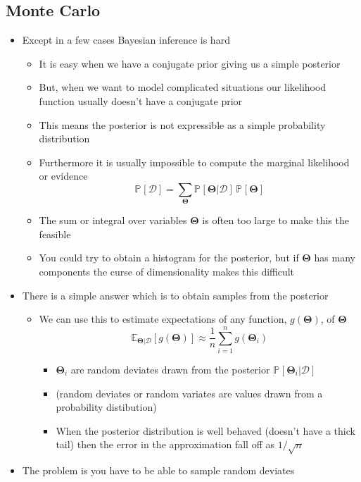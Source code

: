 \documentclass[11pt]{article}
\newcommand{\av}[2][]{\mathbb{E}_{#1\!}\left[ #2 \right]}
\newcommand{\Prob}[2][]{\mathbb{P}_{#1\!}\left[ #2 \right]}
\begin{document}
\subsection{Monte Carlo}
\label{sec:orgd15bcda}
\begin{itemize}
\item Except in a few cases Bayesian inference is hard
\begin{itemize}
\item It is easy when we have a conjugate prior giving us a simple posterior
\item But, when we want to model complicated situations our
likelihood function usually doesn't have a conjugate prior
\item This means the posterior is not expressible as a simple
probability distribution
\item Furthermore it is usually impossible to compute the marginal
likelihood or evidence
$$ \Prob{\mathcal{D}} = \sum_{\bm{\Theta}}
       \Prob{\bm{\Theta}|\mathcal{D}} \, \Prob{\bm{\Theta}} $$
\item The sum or integral over variables \(\bm{\Theta}\) is often too
large to make this the feasible
\item You could try to obtain a histogram for the posterior, but if
\(\bm{\Theta}\) has many components the curse of dimensionality
makes this difficult
\end{itemize}
\item There is a simple answer which is to obtain samples from the posterior
\begin{itemize}
\item We can use this to estimate expectations of any function,
\(g(\bm{\Theta})\), of \(\bm{\Theta}\)
$$ \av[\bm{\Theta}|\mathcal{D}]{g(\bm{\Theta})} \approx
       \frac{1}{n} \sum_{i=1}^{n}   g(\bm{\Theta}_{i}) $$
\begin{itemize}
\item \(\bm{\Theta}_{i}\) are random deviates drawn from
the posterior \(\Prob{\bm{\Theta}_{i}|\mathcal{D}}\)
\item (random deviates or random variates are values drawn from a
probability distibution)
\item When the posterior distribution is well behaved (doesn't have a
thick tail) then the error in the approximation fall off as \(1/\sqrt{n}\)
\end{itemize}
\end{itemize}
\item The problem is you have to be able to sample random deviates

\end{itemize}
\end{document}
